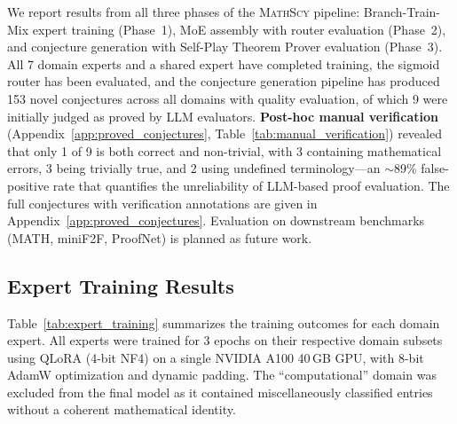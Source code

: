 \documentclass[11pt,a4paper]{article}
\newcommand{\mathscy}{\textsc{MathScy}}
\begin{document}
We report results from all three phases of the \mathscy{} pipeline: Branch-Train-Mix expert training (Phase~1), MoE assembly with router evaluation (Phase~2), and conjecture generation with Self-Play Theorem Prover evaluation (Phase~3). All 7 domain experts and a shared expert have completed training, the sigmoid router has been evaluated, and the conjecture generation pipeline has produced 153 novel conjectures across all domains with quality evaluation, of which 9 were initially judged as proved by LLM evaluators. \textbf{Post-hoc manual verification} (Appendix~\ref{app:proved_conjectures}, Table~\ref{tab:manual_verification}) revealed that only 1 of 9 is both correct and non-trivial, with 3 containing mathematical errors, 3 being trivially true, and 2 using undefined terminology---an $\sim$89\% false-positive rate that quantifies the unreliability of LLM-based proof evaluation. The full conjectures with verification annotations are given in Appendix~\ref{app:proved_conjectures}. Evaluation on downstream benchmarks (MATH, miniF2F, ProofNet) is planned as future work.

\subsection{Expert Training Results}

Table~\ref{tab:expert_training} summarizes the training outcomes for each domain expert. All experts were trained for 3 epochs on their respective domain subsets using QLoRA (4-bit NF4) on a single NVIDIA A100 40\,GB GPU, with 8-bit AdamW optimization and dynamic padding. The ``computational'' domain was excluded from the final model as it contained miscellaneously classified entries without a coherent mathematical identity.
\end{document}
